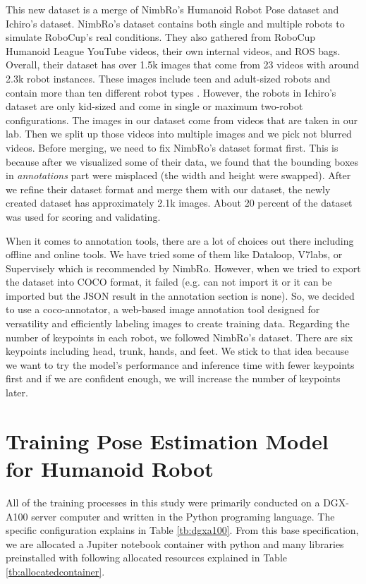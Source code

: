 This new dataset is a merge of NimbRo's Humanoid Robot Pose dataset and Ichiro's dataset. NimbRo's dataset contains both single and multiple robots to
simulate RoboCup's real conditions. They also gathered from RoboCup Humanoid League YouTube videos, their own internal videos, and ROS bags. 
Overall, their dataset has over 1.5k images that come from 23 videos with around 2.3k robot instances. These images include teen and adult-sized robots and contain more than ten different robot types \parencite{amini2021}.
However, the robots in Ichiro's dataset are only kid-sized and come in single or maximum two-robot configurations. The images in our dataset come from videos that are taken in our lab. 
Then we split up those videos into multiple images and we pick not blurred videos.
Before merging, we need to fix NimbRo's dataset format first. This is because after we visualized some of their data, we found that the bounding boxes in \emph{annotations} part were misplaced (the width and height were swapped).
After we refine their dataset format and merge them with our dataset, the newly created dataset has approximately 2.1k images.
About 20 percent of the dataset was used for scoring and validating.

When it comes to annotation tools, there are a lot of choices out there including offline and online tools. We have tried some of them like Dataloop, V7labs, or Supervisely which is recommended by NimbRo.
However, when we tried to export the dataset into COCO format, it failed (e.g. can not import it or it can be imported but the JSON result in the annotation section is none). So, we decided to use a coco-annotator,
a web-based image annotation tool designed for versatility and efficiently labeling images to create training data. Regarding the number of keypoints in each robot, we followed NimbRo's dataset.
There are six keypoints including head, trunk, hands, and feet. We stick to that idea because we want to try the model's performance and inference time with fewer keypoints first and if we are confident enough, we will increase the number of keypoints later.


\section{Training Pose Estimation Model for Humanoid Robot}
\label{sec:trainingrobot}

All of the training processes in this study were primarily conducted on a DGX-A100 server computer and written in the Python programing language. The specific configuration explains in Table \ref{tb:dgxa100}.
From this base specification, we are allocated a Jupiter notebook container with
python and many libraries preinstalled with following allocated resources explained in Table \ref{tb:allocatedcontainer}.

